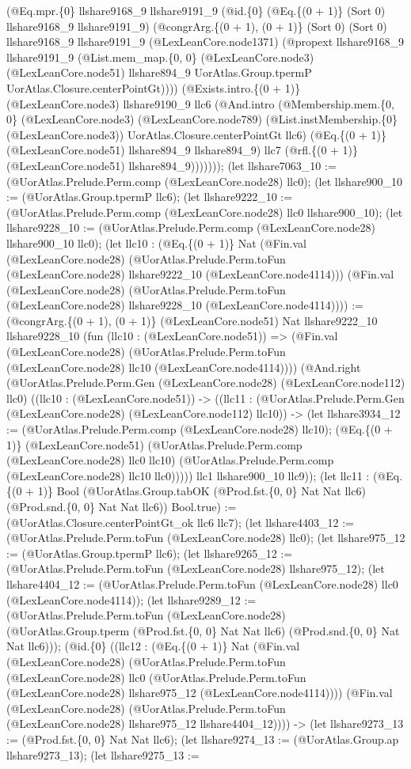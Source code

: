 \documentclass[11pt]{article}
\begin{document}
(@Eq.mpr.\{0\} llshare9168\_9 llshare9191\_9 (@id.\{0\} (@Eq.\{(0 + 1)\} (Sort 0) llshare9168\_9 llshare9191\_9) (@congrArg.\{(0 + 1), (0 + 1)\} (Sort 0) (Sort 0) llshare9168\_9 llshare9191\_9 (@LexLeanCore.node1371) (@propext llshare9168\_9 llshare9191\_9 (@List.mem\_map.\{0, 0\} (@LexLeanCore.node3) (@LexLeanCore.node51) llshare894\_9 UorAtlas.Group.tpermP UorAtlas.Closure.centerPointGt)))) (@Exists.intro.\{(0 + 1)\} (@LexLeanCore.node3) llshare9190\_9 llc6 (@And.intro (@Membership.mem.\{0, 0\} (@LexLeanCore.node3) (@LexLeanCore.node789) (@List.instMembership.\{0\} (@LexLeanCore.node3)) UorAtlas.Closure.centerPointGt llc6) (@Eq.\{(0 + 1)\} (@LexLeanCore.node51) llshare894\_9 llshare894\_9) llc7 (@rfl.\{(0 + 1)\} (@LexLeanCore.node51) llshare894\_9))))))); (let llshare7063\_10 := (@UorAtlas.Prelude.Perm.comp (@LexLeanCore.node28) llc0); (let llshare900\_10 := (@UorAtlas.Group.tpermP llc6); (let llshare9222\_10 := (@UorAtlas.Prelude.Perm.comp (@LexLeanCore.node28) llc0 llshare900\_10); (let llshare9228\_10 := (@UorAtlas.Prelude.Perm.comp (@LexLeanCore.node28) llshare900\_10 llc0); (let llc10 : (@Eq.\{(0 + 1)\} Nat (@Fin.val (@LexLeanCore.node28) (@UorAtlas.Prelude.Perm.toFun (@LexLeanCore.node28) llshare9222\_10 (@LexLeanCore.node4114))) (@Fin.val (@LexLeanCore.node28) (@UorAtlas.Prelude.Perm.toFun (@LexLeanCore.node28) llshare9228\_10 (@LexLeanCore.node4114)))) := (@congrArg.\{(0 + 1), (0 + 1)\} (@LexLeanCore.node51) Nat llshare9222\_10 llshare9228\_10 (fun (llc10 : (@LexLeanCore.node51)) => (@Fin.val (@LexLeanCore.node28) (@UorAtlas.Prelude.Perm.toFun (@LexLeanCore.node28) llc10 (@LexLeanCore.node4114)))) (@And.right (@UorAtlas.Prelude.Perm.Gen (@LexLeanCore.node28) (@LexLeanCore.node112) llc0) ((llc10 : (@LexLeanCore.node51)) -> ((llc11 : (@UorAtlas.Prelude.Perm.Gen (@LexLeanCore.node28) (@LexLeanCore.node112) llc10)) -> (let llshare3934\_12 := (@UorAtlas.Prelude.Perm.comp (@LexLeanCore.node28) llc10); (@Eq.\{(0 + 1)\} (@LexLeanCore.node51) (@UorAtlas.Prelude.Perm.comp (@LexLeanCore.node28) llc0 llc10) (@UorAtlas.Prelude.Perm.comp (@LexLeanCore.node28) llc10 llc0))))) llc1 llshare900\_10 llc9)); (let llc11 : (@Eq.\{(0 + 1)\} Bool (@UorAtlas.Group.tabOK (@Prod.fst.\{0, 0\} Nat Nat llc6) (@Prod.snd.\{0, 0\} Nat Nat llc6)) Bool.true) := (@UorAtlas.Closure.centerPointGt\_ok llc6 llc7); (let llshare4403\_12 := (@UorAtlas.Prelude.Perm.toFun (@LexLeanCore.node28) llc0); (let llshare975\_12 := (@UorAtlas.Group.tpermP llc6); (let llshare9265\_12 := (@UorAtlas.Prelude.Perm.toFun (@LexLeanCore.node28) llshare975\_12); (let llshare4404\_12 := (@UorAtlas.Prelude.Perm.toFun (@LexLeanCore.node28) llc0 (@LexLeanCore.node4114)); (let llshare9289\_12 := (@UorAtlas.Prelude.Perm.toFun (@LexLeanCore.node28) (@UorAtlas.Group.tperm (@Prod.fst.\{0, 0\} Nat Nat llc6) (@Prod.snd.\{0, 0\} Nat Nat llc6))); (@id.\{0\} ((llc12 : (@Eq.\{(0 + 1)\} Nat (@Fin.val (@LexLeanCore.node28) (@UorAtlas.Prelude.Perm.toFun (@LexLeanCore.node28) llc0 (@UorAtlas.Prelude.Perm.toFun (@LexLeanCore.node28) llshare975\_12 (@LexLeanCore.node4114)))) (@Fin.val (@LexLeanCore.node28) (@UorAtlas.Prelude.Perm.toFun (@LexLeanCore.node28) llshare975\_12 llshare4404\_12)))) -> (let llshare9273\_13 := (@Prod.fst.\{0, 0\} Nat Nat llc6); (let llshare9274\_13 := (@UorAtlas.Group.ap llshare9273\_13); (let llshare9275\_13 := 
\end{document}

